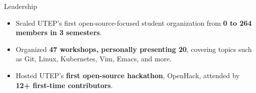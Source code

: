 \documentclass{resume} %
\begin{document}
\begin{workSection}{Leadership}
    
    \customItem[
    	title=President \& Founder - \href{https://www.instagram.com/foss.utep/}{\textbf{Free and Open Source Software Club at UTEP} \faExternalLink},
    	duration=December 2023 - March 2025
    ]
    \begin{itemize}
    	\vspace{-0.5em}
    	\itemsep -6pt {}
    	\item Scaled UTEP's first open-source-focused student organization from \textbf{0 to 264 members in 3 semesters}. %
		\item Organized \textbf{47 workshops, personally presenting 20}, covering topics such as Git, Linux, Kubernetes, Vim, Emacs, and more.
		\item Hosted UTEP's \textbf{first open-source hackathon}, OpenHack, attended by \textbf{12+ first-time contributors}.
    \end{itemize}


\end{workSection}
\end{document}
